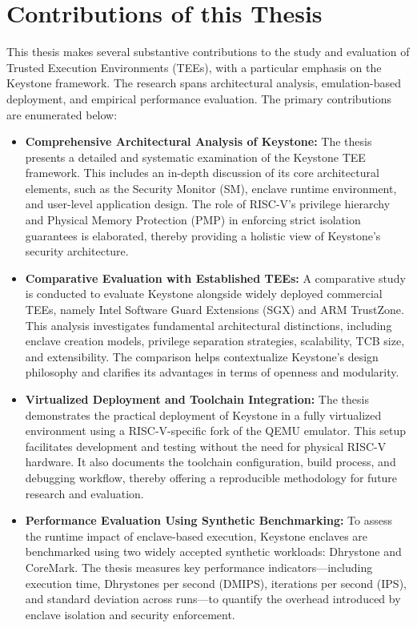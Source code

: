 \section{Contributions of this Thesis}
This thesis makes several substantive contributions to the study and evaluation of Trusted Execution Environments (TEEs), with a particular emphasis on the Keystone framework. The research spans architectural analysis, emulation-based deployment, and empirical performance evaluation. The primary contributions are enumerated below:

\begin{itemize}
\item \textbf{Comprehensive Architectural Analysis of Keystone:}
The thesis presents a detailed and systematic examination of the Keystone TEE framework. This includes an in-depth discussion of its core architectural elements, such as the Security Monitor (SM), enclave runtime environment, and user-level application design. The role of RISC-V’s privilege hierarchy and Physical Memory Protection (PMP) in enforcing strict isolation guarantees is elaborated, thereby providing a holistic view of Keystone’s security architecture.
\item \textbf{Comparative Evaluation with Established TEEs:}  
A comparative study is conducted to evaluate Keystone alongside widely deployed commercial TEEs, namely Intel Software Guard Extensions (SGX) and ARM TrustZone. This analysis investigates fundamental architectural distinctions, including enclave creation models, privilege separation strategies, scalability, TCB size, and extensibility. The comparison helps contextualize Keystone’s design philosophy and clarifies its advantages in terms of openness and modularity.

\item \textbf{Virtualized Deployment and Toolchain Integration:}  
The thesis demonstrates the practical deployment of Keystone in a fully virtualized environment using a RISC-V-specific fork of the QEMU emulator. This setup facilitates development and testing without the need for physical RISC-V hardware. It also documents the toolchain configuration, build process, and debugging workflow, thereby offering a reproducible methodology for future research and evaluation.

\item \textbf{Performance Evaluation Using Synthetic Benchmarking:}  
To assess the runtime impact of enclave-based execution, Keystone enclaves are benchmarked using two widely accepted synthetic workloads: Dhrystone and CoreMark. The thesis measures key performance indicators—including execution time, Dhrystones per second (DMIPS), iterations per second (IPS), and standard deviation across runs—to quantify the overhead introduced by enclave isolation and security enforcement.


\end{itemize}
